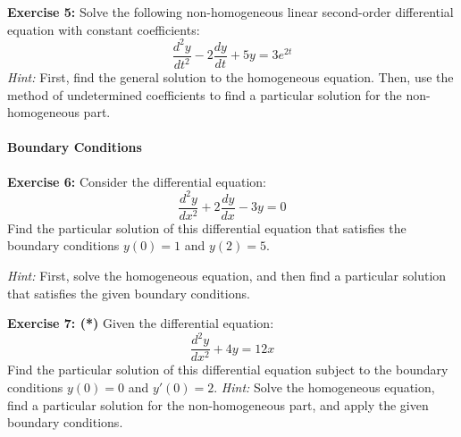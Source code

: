 \documentclass[]{article}
\begin{document}
	\textbf{Exercise 5:}
	Solve the following non-homogeneous linear second-order differential equation with constant coefficients:
	$$
	\frac{d^2y}{dt^2} - 2\frac{dy}{dt} + 5y = 3e^{2t}
	$$
	\textit{Hint:} First, find the general solution to the homogeneous equation. Then, use the method of undetermined coefficients to find a particular solution for the non-homogeneous part.
	
	\paragraph{Boundary Conditions}\mbox{}
	
	\textbf{Exercise 6:}
	Consider the differential equation:
	$$
	\frac{d^2y}{dx^2} + 2\frac{dy}{dx} - 3y = 0
	$$
	Find the particular solution of this differential equation that satisfies the boundary conditions $y(0) = 1$ and $y(2) = 5$.
	
	\textit{Hint:} First, solve the homogeneous equation, and then find a particular solution that satisfies the given boundary conditions.
	
	\textbf{Exercise 7: (*)}
	Given the differential equation:
	$$
	\frac{d^2y}{dx^2} + 4y = 12x
	$$
	Find the particular solution of this differential equation subject to the boundary conditions $y(0) = 0$ and $y'(0) = 2$.
	\textit{Hint:} Solve the homogeneous equation, find a particular solution for the non-homogeneous part, and apply the given boundary conditions.
	
	
	
\end{document}
